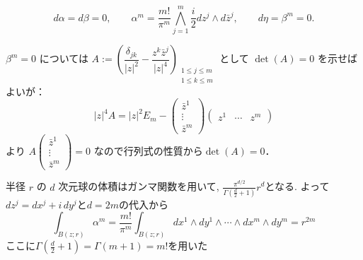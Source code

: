 \begin{rem}
\label{rem-H-5.1}
\begin{equation*}
d\alpha=d\beta=0,\qquad
\alpha^m=\frac{m!}{\pi^m}\bigwedge_{j=1}^m\frac{i}{2}dz^j\wedge d\bar{z}^j,\qquad
d\eta=\beta^m=0.
\end{equation*}

$\beta^m=0$ については
$A:=\left(\dfrac{\delta_{jk}}{|z|^2}-\dfrac{z^k\bar{z}^j}{|z|^4}\right)_{\substack{1\leq j\leq m\\1\leq k\leq m}}$
として $\det(A)=0$ を示せばよいが：
\begin{equation*}
|z|^4A
=
|z|^2E_m
-
\begin{pmatrix}
\bar{z}^1\\
\vdots\\
\bar{z}^m
\end{pmatrix}
\begin{pmatrix}
z^1&\cdots&z^m
\end{pmatrix}
\end{equation*}
より
$A\begin{pmatrix}\bar{z}^1\\ \vdots\\ \bar{z}^m\end{pmatrix}=0$
なので行列式の性質から$\det(A)=0$．
\end{rem}

\begin{rem}
\label{rem-H-5.2}
半径 $r$ の $d$ 次元球の体積はガンマ関数を用いて, 
$\frac{\pi^{d/2}}{\Gamma\left(\frac{d}{2}+1\right)}r^d
$となる. よって$dz^j=dx^j+i\,dy^j$と$d=2m$の代入から
\begin{equation*}
\int_{B(z;r)}\alpha^m
=
\frac{m!}{\pi^m}
\int_{B(z;r)}
dx^1\wedge dy^1\wedge\cdots\wedge dx^m\wedge dy^m
=
r^{2m}
\end{equation*}
ここに$\Gamma\left(\frac{d}{2}+1\right)=\Gamma\left(m+1\right)=m!$を用いた
\end{rem}

